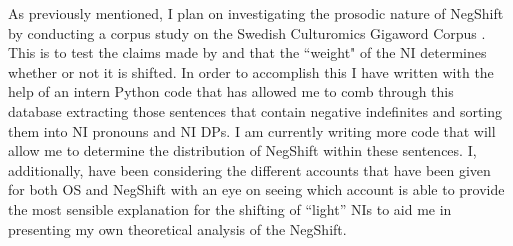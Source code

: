 \documentclass[12pt, letterpaper]{article}
\begin{document}
As previously mentioned, I plan on investigating the prosodic nature of NegShift by conducting a corpus study on the Swedish Culturomics Gigaword Corpus \citep{eideSwedishCulturomicsGigaword2016}. This is to test the claims made by \citet{christensenInterfacesNegationSyntax2005} and \citet{penkaNegativeIndefinites2011} that the ``weight" of the NI determines whether or not it is shifted. In order to accomplish this I have written with the help of an intern Python code that has allowed me to comb through this database extracting those sentences that contain negative indefinites and sorting them into NI pronouns and NI DPs. I am currently writing more code that will allow me to determine the distribution of NegShift within these sentences. I, additionally, have been considering the different accounts that have been given for both OS and NegShift with an eye on seeing which account is able to provide the most sensible explanation for the shifting of ``light'' NIs to aid me in presenting my own theoretical analysis of the NegShift.


\printbibliography[heading=bibintoc]
\end{document}
